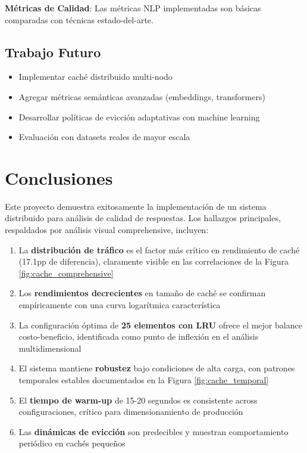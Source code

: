 \documentclass[12pt,a4paper]{article}
\begin{document}
\textbf{Métricas de Calidad}: Las métricas NLP implementadas son básicas comparadas con técnicas estado-del-arte.

\subsection{Trabajo Futuro}

\begin{itemize}
\item Implementar caché distribuido multi-nodo
\item Agregar métricas semánticas avanzadas (embeddings, transformers)
\item Desarrollar políticas de evicción adaptativas con machine learning
\item Evaluación con datasets reales de mayor escala
\end{itemize}

\section{Conclusiones}

Este proyecto demuestra exitosamente la implementación de un sistema distribuido para análisis de calidad de respuestas. Los hallazgos principales, respaldados por análisis visual comprehensive, incluyen:

\begin{enumerate}
\item La \textbf{distribución de tráfico} es el factor más crítico en rendimiento de caché (17.1pp de diferencia), claramente visible en las correlaciones de la Figura \ref{fig:cache_comprehensive}
\item Los \textbf{rendimientos decrecientes} en tamaño de caché se confirman empíricamente con una curva logarítmica característica
\item La configuración óptima de \textbf{25 elementos con LRU} ofrece el mejor balance costo-beneficio, identificada como punto de inflexión en el análisis multidimensional
\item El sistema mantiene \textbf{robustez} bajo condiciones de alta carga, con patrones temporales estables documentados en la Figura \ref{fig:cache_temporal}
\item El \textbf{tiempo de warm-up} de 15-20 segundos es consistente across configuraciones, crítico para dimensionamiento de producción
\item Las \textbf{dinámicas de evicción} son predecibles y muestran comportamiento periódico en cachés pequeños
\end{enumerate}
\end{document}
